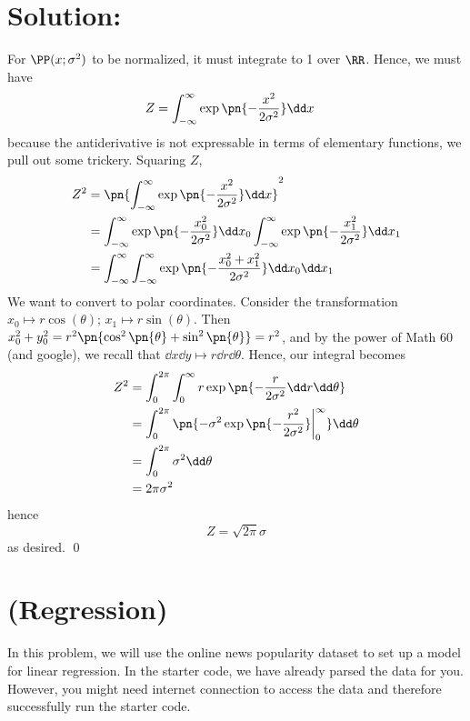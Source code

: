\documentclass[189]{pset}
\begin{document}
  \section*{Solution:}
    For $\PP(x;\sigma^2)$ to be normalized, it must integrate to 1
    over $\RR$. Hence, we must have
    \begin{align*}
      Z
      &= \int_{-\infty}^\infty \exp\pn{-\frac{x^2}{2\sigma^2}}\dd x
    \end{align*}
    because the antiderivative is not expressable in terms of
    elementary functions, we pull out some trickery. Squaring $Z$,
    \begin{align*}
      Z^2
      &= \pn{\int_{-\infty}^\infty \exp\pn{-\frac{x^2}{2\sigma^2}}\dd
        x}^2 \\
      &= \int_{-\infty}^\infty \exp\pn{-\frac{x_0^2}{2\sigma^2}}\dd
        x_0 \int_{-\infty}^\infty \exp\pn{-\frac{x_1^2}{2\sigma^2}}\dd
        x_1 \\
      &= \int_{-\infty}^\infty \int_{-\infty}^\infty \exp\pn{-\frac{
        x_0^2 + x_1^2}{2\sigma^2}} \dd x_0 \dd x_1
    \end{align*}
    We want to convert to polar coordinates. Consider the
    transformation $x_0 \mapsto r\cos(\theta)$; $x_1 \mapsto
    r\sin(\theta)$. Then $x_0^2 + y_0^2 = r^2\pn{\cos^2\pn{\theta} +
      \sin^2\pn{\theta}} = r^2$, and by the power of Math 60 (and
    google), we recall that $\dd x \dd y \mapsto r \dd r \dd \theta$.
    Hence, our integral becomes
    \begin{align*}
      Z^2
      &= \int_0^{2\pi} \int_0^\infty r\exp\pn{-\frac{r}{2\sigma^2} \dd
        r \dd \theta} \\
      &= \int_0^{2\pi} \pn{-\sigma^2 \exp\pn{-\frac{r^2}{2\sigma^2}}
        \bigg\vert_0^\infty } \dd \theta \\
      &= \int_0^{2\pi} \sigma^2 \dd \theta \\
      &= 2\pi \sigma^2
    \end{align*}
    hence
    \[
      \boxed{Z = \sqrt{2\pi}\sigma}
    \]
    as desired. \qed

  \clearpage


  \section{(Regression)}
    In this problem, we will use the online news popularity dataset to
    set up a model for linear regression. In the starter code, we have
    already parsed the data for you. However, you might need internet
    connection to access the data and therefore successfully run the
    starter code.
\end{document}

